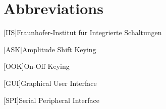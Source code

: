 \chapter*{Abbreviations}

\begin{acronym}
	[IIS]{Fraunhofer-Institut für Integrierte Schaltungen}
\end{acronym}

\begin{acronym}
	[ASK]{Amplitude Shift Keying}
\end{acronym}

\begin{acronym}
	[OOK]{On-Off Keying}
\end{acronym}

\begin{acronym}
	[GUI]{Graphical User Interface}
\end{acronym}

\begin{acronym}
	[SPI]{Serial Peripheral Interface}
\end{acronym}